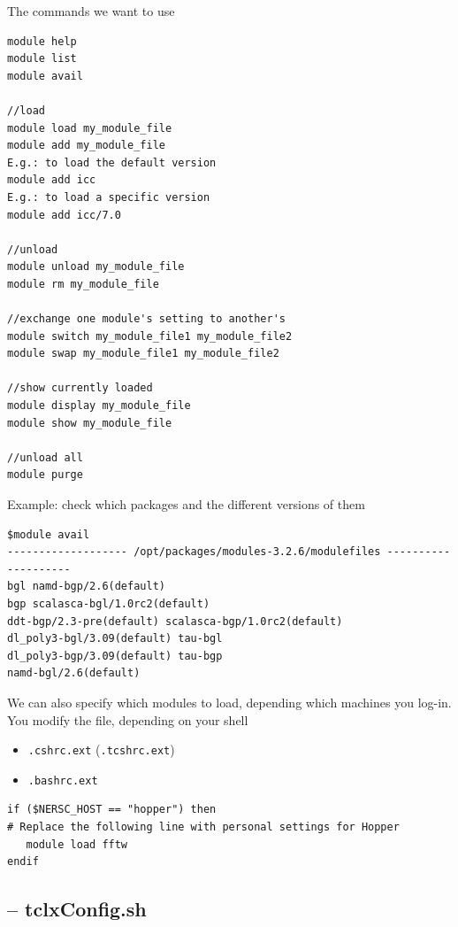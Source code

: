 The commands we want to use
\begin{verbatim}
module help
module list
module avail

//load
module load my_module_file
module add my_module_file
E.g.: to load the default version
module add icc
E.g.: to load a specific version
module add icc/7.0

//unload
module unload my_module_file
module rm my_module_file

//exchange one module's setting to another's
module switch my_module_file1 my_module_file2
module swap my_module_file1 my_module_file2

//show currently loaded 
module display my_module_file
module show my_module_file

//unload all
module purge

\end{verbatim}

Example: check which packages and the different versions of them
\begin{verbatim}
$module avail
------------------- /opt/packages/modules-3.2.6/modulefiles --------------------
bgl namd-bgp/2.6(default)
bgp scalasca-bgl/1.0rc2(default)
ddt-bgp/2.3-pre(default) scalasca-bgp/1.0rc2(default)
dl_poly3-bgl/3.09(default) tau-bgl
dl_poly3-bgp/3.09(default) tau-bgp
namd-bgl/2.6(default)
\end{verbatim}

We can also specify which modules to load, depending which machines you log-in.
You modify the file, depending on your shell
\begin{itemize}
  \item \verb!.cshrc.ext! (\verb!.tcshrc.ext!)
  \item \verb!.bashrc.ext!
\end{itemize}

\begin{verbatim}
if ($NERSC_HOST == "hopper") then
# Replace the following line with personal settings for Hopper
   module load fftw
endif
\end{verbatim}

\subsection{-- tclxConfig.sh}
\label{sec:tclxConfig.sh}

